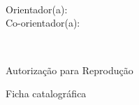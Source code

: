 \documentclass[normaltoc, espacoumemeio, pnumromarab,ruledheader]{abnt}
\renewcommand{\capa} {%
\begin{titlepage}
\makeheader
\begin{center}
\vfill
{
\Large\ABNTautordata}\\[2cm]
{\LARGE\textbf{\ABNTtitulodata}}\\[2cm]

\vfill
{\large \ABNTlocaldata \\ \ABNTdatadata}
\end{center}
\end{titlepage}}
\renewcommand{\folhaderosto}{
\begin{titlepage}
	\vfill
	\begin{center}
		{\large \ABNTautordata}\\[5cm]
		{\LARGE \textbf{\ABNTtitulodata}}\\[2cm]
		\hspace{.45\textwidth}
		\begin{minipage}{.5\textwidth}
		\begin{espacosimples}
			\begin{small}
				\ABNTcomentariodata
				\\ \\
				\\
				Orientador(a): \ABNTorientadordata
				\\
				Co-orientador(a): \ABNTcoorientadordata
			\end{small}
		\end{espacosimples}
		\end{minipage}
		\vfill
		{\large \ABNTlocaldata \\ \ABNTdatadata}
	\end{center}
\end{titlepage}
}
\begin{document}
\capa

\folhaderosto



% 


\pretextualchapter{}

\begin{center}
Autorização para Reprodução

Ficha catalográfica
\end{center}

%
%
%
%

\end{document}
